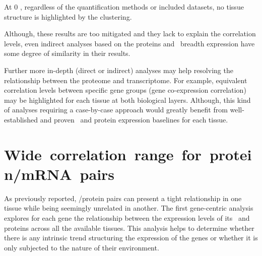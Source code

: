 At $0$ \FPKM, regardless of the quantification methods or included datasets,
no tissue structure is highlighted by the clustering.

Although, these results are too mitigated and
they lack to explain the correlation levels,
even indirect analyses based on the proteins and \mRNAs\ breadth expression
have some degree of similarity in their results.

Further more in-depth (direct or indirect)  analyses
may help resolving the relationship between the proteome and transcriptome.
For example, equivalent correlation levels between specific gene groups
(gene co-expression correlation) may be highlighted
for each tissue at both biological layers.
Although, this kind of analyses requiring a case-by-case approach
would greatly benefit from
well-established and proven \mRNA\ and protein expression baselines
for each tissue.


\section{Wide~correlation~range~for~protein/mRNA~pairs}
As previously reported, %
\mRNA/protein pairs can present
a tight relationship in one tissue
while being seemingly unrelated in another.
The first gene-centric analysis explores for each gene
the relationship between the expression levels of its \mRNAs\ and proteins
across all the available tissues.
This analysis helps to determine
whether there is any intrinsic trend structuring the expression of the genes
or whether it is only subjected to the nature of their environment.\\
\vspace{-\baselineskip}

